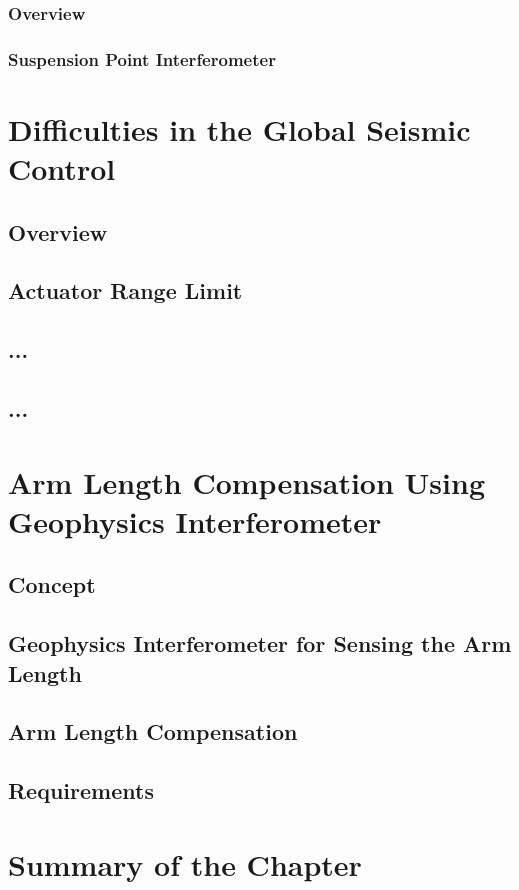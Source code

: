 \subsubsection{Overview}
\subsubsection{Suspension Point Interferometer}

%
\section{Difficulties in the Global Seismic Control}
\subsection{Overview}
\subsection{Actuator Range Limit}
\subsection{...}
\subsection{...}


%
\section{Arm Length Compensation Using Geophysics Interferometer}
\subsection{Concept}
\subsection{Geophysics Interferometer for Sensing the Arm Length}
\subsection{Arm Length Compensation}
\subsection{Requirements}


\section{Summary of the Chapter}
